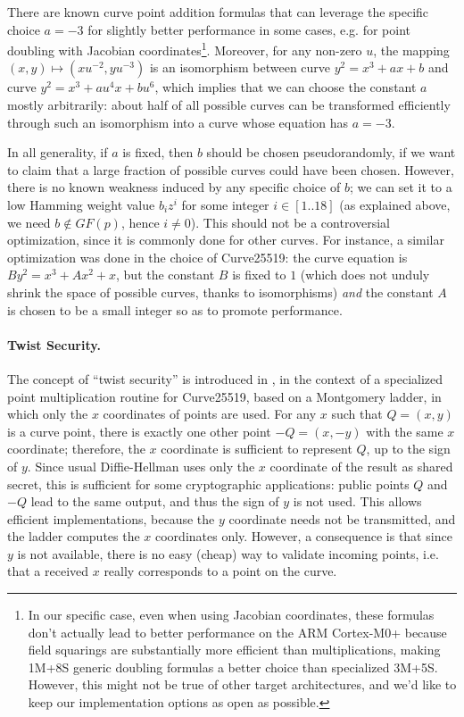 \documentclass{llncs}
\newcommand{\GF}{GF}
\begin{document}
There are known curve point addition formulas that can leverage the
specific choice $a = -3$ for slightly better performance in some cases,
e.g. for point doubling with Jacobian
coor\-dinates\cite{EFD}\footnote{In our specific case, even when using
Jacobian coordinates, these formulas don't actually lead to better
performance on the ARM Cortex-M0+ because field squarings are
substantially more efficient than multiplications, making 1M+8S generic
doubling formulas a better choice than specialized 3M+5S. However, this
might not be true of other target architectures, and we'd like to keep
our implementation options as open as possible.}. Moreover, for any
non-zero $u$, the mapping $(x,y) \mapsto (xu^{-2},yu^{-3})$ is an
isomorphism between curve $y^2 = x^3+ax+b$ and curve $y^2 =
x^3+au^4x+bu^6$, which implies that we can choose the constant $a$
mostly arbitrarily: about half of all possible curves can be transformed
efficiently through such an isomorphism into a curve whose equation has
$a = -3$.

In all generality, if $a$ is fixed, then $b$ should be chosen
pseudorandomly, if we want to claim that a large fraction of possible
curves could have been chosen. However, there is no known weakness
induced by any specific choice of $b$; we can set it to a low Hamming
weight value $b_i z^i$ for some integer $i \in [1..18]$ (as explained
above, we need $b \notin \GF(p)$, hence $i \neq 0$). This should not be
a controversial optimization, since it is commonly done for other
curves. For instance, a similar optimization was done in the choice
of Curve25519: the curve equation is $By^2 = x^3 + Ax^2 + x$, but the
constant $B$ is fixed to $1$ (which does not unduly shrink the space of
possible curves, thanks to isomorphisms) \emph{and} the constant $A$ is
chosen to be a small integer so as to promote performance\cite{Ber2006}.

\paragraph{Twist Security.}

The concept of ``twist security'' is introduced in \cite{Ber2006}, in
the context of a specialized point multiplication routine for
Curve25519, based on a Montgomery ladder, in which only the $x$
coordinates of points are used. For any $x$ such that $Q = (x,y)$ is a
curve point, there is exactly one other point $-Q = (x,-y)$ with the
same $x$ coordinate; therefore, the $x$ coordinate is sufficient to
represent $Q$, up to the sign of $y$. Since usual Diffie-Hellman uses
only the $x$ coordinate of the result as shared secret, this is
sufficient for some cryptographic applications: public points $Q$ and
$-Q$ lead to the same output, and thus the sign of $y$ is not used. This
allows efficient implementations, because the $y$ coordinate needs not
be transmitted, and the ladder computes the $x$ coordinates only.
However, a consequence is that since $y$ is not available, there is no
easy (cheap) way to validate incoming points, i.e. that a received $x$
really corresponds to a point on the curve.
\end{document}
